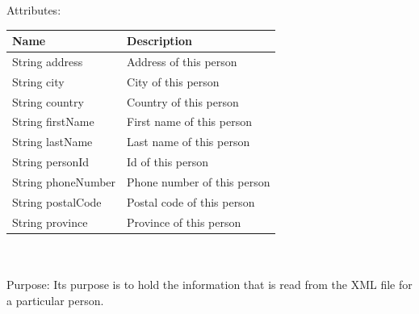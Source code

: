 Attributes:\\
\begin{tabular}{| l | l |}
\hline
 Name                                       & Description\\
\hline
String address		 	 & Address of this person\\
\hline
String city		 	 & City of this person\\
\hline
String country		 	 & Country of this person\\
\hline
String firstName		  & First name of this person\\
\hline
String lastName		  & Last name of this person\\
\hline
String personId		  & Id of this person\\
\hline
String phoneNumber		  & Phone number of this person\\
\hline
String postalCode		  & Postal code of this person\\
\hline
String province		  & Province of this person\\
\hline
\end{tabular}\\
\\

Purpose: Its purpose is to hold the information that is read from the XML file for a particular person.
\\
\\

